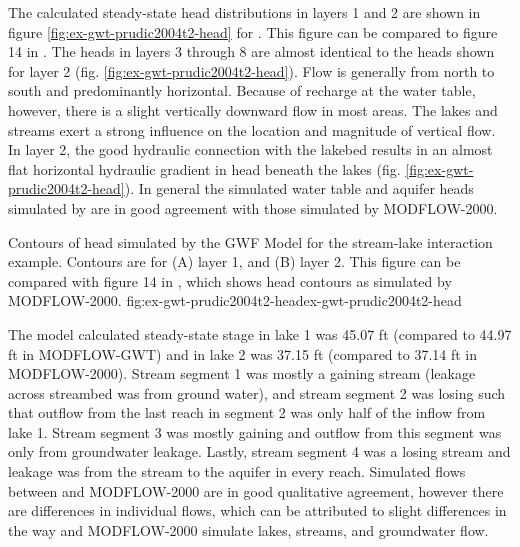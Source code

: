 The calculated steady-state head distributions in layers 1 and 2 are shown in figure \ref{fig:ex-gwt-prudic2004t2-head} for \mf.  This figure can be compared to figure 14 in \cite{modflowsfr1pack}. The heads in layers 3 through 8 are almost identical to the heads shown for layer 2 (fig. \ref{fig:ex-gwt-prudic2004t2-head}).  Flow is generally from north to south and predominantly horizontal. Because of recharge at the water table, however, there is a slight vertically downward flow in most areas. The lakes and streams exert a strong influence on the location and magnitude of vertical flow. In layer 2, the good hydraulic connection with the lakebed results in an almost flat horizontal hydraulic gradient in head beneath the lakes (fig. \ref{fig:ex-gwt-prudic2004t2-head}).  In general the simulated water table and aquifer heads simulated by \mf are in good agreement with those simulated by MODFLOW-2000.

\begin{StandardFigure}{
                                     Contours of head simulated by the \mf GWF Model for the stream-lake interaction example.  Contours are for (A) layer 1, and (B) layer 2.  This figure can be compared with figure 14 in \cite{modflowsfr1pack}, which shows head contours as simulated by MODFLOW-2000.
                                     }{fig:ex-gwt-prudic2004t2-head}{ex-gwt-prudic2004t2-head}
\end{StandardFigure}            

The \mf model calculated steady-state stage in lake 1 was 45.07 ft (compared to 44.97 ft in MODFLOW-GWT) and in lake 2 was 37.15 ft (compared to 37.14 ft in MODFLOW-2000). Stream segment 1 was mostly a gaining stream (leakage across streambed was from ground water), and stream segment 2 was losing such that outflow from the last reach in segment 2 was only half of the inflow from lake 1. Stream segment 3 was mostly gaining and outflow from this segment was only from groundwater leakage. Lastly, stream segment 4 was a losing stream and leakage was from the stream to the aquifer in every reach.  Simulated flows between \mf and MODFLOW-2000 are in good qualitative agreement, however there are differences in individual flows, which can be attributed to slight differences in the way \mf and MODFLOW-2000 simulate lakes, streams, and groundwater flow.

